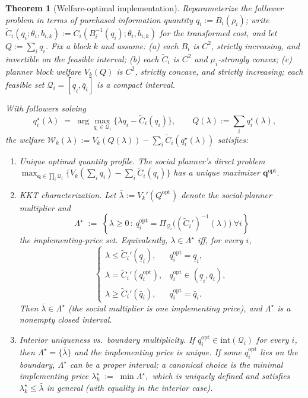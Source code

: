 \documentclass{article}
\newtheorem{theorem}{Theorem}
\begin{document}
\begin{theorem}[Welfare-optimal implementation]
    \label{thm:WO}
    Reparameterize the follower problem in terms of purchased information quantity $q_i := B_i(\rho_i)$; write $\widetilde C_i(q_i;\theta_i, b_{i,k}) := C_i(B_i^{-1}(q_i); \theta_i, b_{i,k})$ for the transformed cost, and let $Q := \sum_i q_i$. Fix a block $k$ and assume: (a) each $B_i$ is $C^2$, strictly increasing, and invertible on the feasible interval; (b) each $\widetilde C_i$ is $C^2$ and $\mu_i$-strongly convex; (c) planner block welfare $V_k(Q)$ is $C^2$, strictly concave, and strictly increasing; each feasible set $\mathcal{Q}_i = [\underline q_i, \bar q_i]$ is a compact interval.

    With followers solving
    $$q_i^\star(\lambda) \;=\; \arg\max_{q_i \in \mathcal{Q}_i} \{\lambda q_i - \widetilde C_i(q_i)\}, \qquad Q(\lambda) := \textstyle\sum_i q_i^\star(\lambda),$$
    the welfare $\mathcal{W}_k(\lambda) := V_k(Q(\lambda)) - \sum_i \widetilde C_i(q_i^\star(\lambda))$ satisfies:

    \begin{enumerate}
        \item Unique optimal quantity profile. The social planner's direct problem $\max_{\mathbf q \in \prod_i \mathcal Q_i}\{V_k(\sum_i q_i) - \sum_i \widetilde C_i(q_i)\}$ has a unique maximizer $\mathbf q^{\mathrm{opt}}$.
        \item  KKT characterization. Let $\bar\lambda := V_k'(Q^{\mathrm{opt}})$ denote the social-planner multiplier and
        $$\Lambda^\star \;:=\; \left\{\lambda \ge 0 \,:\, q_i^{\mathrm{opt}} = \Pi_{\mathcal Q_i}\!\big((\widetilde C_i')^{-1}(\lambda)\big) \ \forall i\right\}$$
        the implementing-price set. Equivalently, $\lambda \in \Lambda^\star$ iff, for every $i$,
        $$\begin{cases} \lambda \le \widetilde C_i'(\underline q_i), & q_i^{\mathrm{opt}} = \underline q_i, \\ \lambda = \widetilde C_i'(q_i^{\mathrm{opt}}), & q_i^{\mathrm{opt}} \in (\underline q_i, \bar q_i), \\ \lambda \ge \widetilde C_i'(\bar q_i), & q_i^{\mathrm{opt}} = \bar q_i. \end{cases}$$
        Then $\bar\lambda \in \Lambda^\star$ (the social multiplier is one implementing price), and $\Lambda^\star$ is a nonempty closed interval.
        
        \item Interior uniqueness vs.\ boundary multiplicity. If $q_i^{\mathrm{opt}} \in \mathrm{int}(\mathcal Q_i)$ for every $i$, then $\Lambda^\star = \{\bar\lambda\}$ and the implementing price is unique. If some $q_i^{\mathrm{opt}}$ lies on the boundary, $\Lambda^\star$ can be a proper interval; a canonical choice is the minimal implementing price
        $\lambda_k^\star \;:=\; \min \Lambda^\star,$
        which is uniquely defined and satisfies $\lambda_k^\star \le \bar\lambda$ in general (with equality in the interior case).
    \end{enumerate}
\end{theorem}
\end{document}

